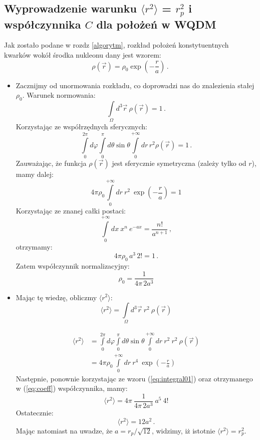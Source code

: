 \documentclass[a4paper,12pt]{article}
\begin{document}
\subsection{Wyprowadzenie  warunku $\langle r^2 \rangle$  = $r_p^2$ i współczynnika $C$ dla położeń w WQDM} \label{appendix-proof-C-and-rms}
Jak zostało podane w rozdz \ref{algorytm}, rozkład położeń konstytuentnych kwarków wokół środka nukleonu dany jest wzorem:
\begin{equation}\label{eq:eq-quark-distr-basic}
\rho(\vec{r})=\rho_0\exp\left(-\frac{r}{a}\right)\,.
\end{equation}
\begin{itemize}
\item Zacznijmy od unormowania rozkładu, co doprowadzi nas do znalezienia stałej $\rho_0$. Warunek normowania:
\begin{equation}\label{eq:norm-integral}
\int\limits_{\Omega} d^3\vec{r}\: \rho(\vec{r}) = 1\,.
\end{equation}
Korzystając ze współrzędnych sferycznych:
\begin{equation}
\int\limits_{0}^{2\pi}d\varphi \int\limits_{0}^{\pi}d\theta \sin\theta \int\limits_{0}^{+\infty}dr\, r^2 \rho(\vec{r}) = 1\,.
\end{equation}
Zauważając, że funkcja $\rho(\vec{r})$ jest sferycznie symetryczna (zależy tylko od $r$), mamy dalej:
\begin{equation}
4\pi \rho_0 \int\limits_{0}^{+\infty}dr\: r^2 \: \exp\left(-\frac{r}{a}\right) = 1
\end{equation}
Korzystając ze znanej całki postaci:
\begin{equation} \label{eq:integral01}
\int\limits_{0}^{+\infty}dx\: x^n \: e^{-ax} = \frac{n!}{a^{n+1}}\,,
\end{equation}
otrzymamy:
\[ 4\pi \rho_0 \, a^3\, 2! = 1\,. \]
Zatem współczynnik normalizacyjny:
\begin{equation}\label{eq:coeff}
\rho_0 = \frac{1}{4\pi \, 2a^3}
\end{equation}

\item Mając tę wiedzę, obliczmy $\langle r^2 \rangle$:
\begin{equation} 
\langle r^2 \rangle = \int\limits_{\Omega} d^3\vec{r}\: r^2 \: \rho(\vec{r})
\end{equation}

\[
\begin{split}
\langle r^2 \rangle & = \int\limits_{0}^{2\pi}d\varphi \int\limits_{0}^{\pi}d\theta \sin\theta \int\limits_{0}^{+\infty}dr \: r^2 \: r^2 \: \rho(\vec{r}) \\
 & = 4\pi \rho_0 \int\limits_{0}^{+\infty}dr\: r^4 \: \exp\left(-\frac{r}{a}\right)
\end{split}
\]
Następnie, ponownie korzystając ze wzoru (\ref{eq:integral01}) oraz otrzymanego w (\ref{eq:coeff}) współczynnika, mamy:
\[ \langle r^2 \rangle = 4\pi \: \frac{1}{4\pi \, 2a^3} \: a^5 \: 4! \]
Ostatecznie:
\begin{equation} 
\langle r^2 \rangle = 12 a^2\,.
\end{equation}
Mając natomiast na uwadze, że $a = r_p/\sqrt{12}$, widzimy, iż istotnie $\langle r^2 \rangle = r_p^2$.


\end{itemize}
\end{document}
